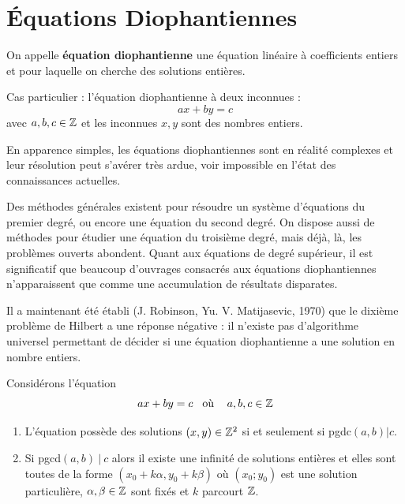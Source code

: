 \section{Équations Diophantiennes}

\begin{definition}
On appelle \textbf{équation diophantienne} une équation linéaire à coefficients entiers et pour laquelle on cherche des solutions entières.

\medskip
Cas particulier : l'équation diophantienne à deux inconnues : 
$$ax+by=c$$
avec $a,b,c\in\Z$ et les inconnues $x,y$ sont des nombres entiers.

\end{definition}

En apparence simples, les équations diophantiennes sont en réalité complexes et leur résolution peut s'avérer très ardue, voir impossible en l'état des connaissances actuelles.

\smallskip
Des méthodes générales existent pour résoudre un système d'équations du premier degré, ou encore une équation du second degré. On dispose aussi de méthodes pour étudier une équation du troisième degré, mais déjà, là, les problèmes ouverts abondent. Quant aux équations de degré supérieur, il est significatif que beaucoup d'ouvrages consacrés aux équations diophantiennes n'apparaissent que comme une accumulation de résultats disparates.


\smallskip
Il a maintenant été établi (J. Robinson, Yu. V. Matijasevic, 1970) que le dixième problème de Hilbert a une réponse négative : il n'existe pas d'algorithme universel permettant de décider si une équation diophantienne a une solution en nombre entiers.

\smallskip



\label{ssec:dioph}

\begin{proposition}
\label{prop:equations_diophantiennes}
Considérons l'équation
$$
ax+by=c \textrm{\eh{3}où\eh{3} } a,b,c \in \Z$$
\begin{enumerate}[label=\arabic*),left=0mm]
  \item L'équation possède des solutions $(x,y)\in \Z^2$ si et seulement si
pgdc$(a,b) | c$.
  \item Si pgcd$(a,b)\ |\ c$ alors il existe une infinité de solutions entières et elles sont toutes de la forme $(x_0+ k\alpha, y_0 + k\beta)$ où $(x_0;y_0)$ est une solution particulière, $\alpha,\beta \in \Z$ sont fixés et $k$ {parcourt $\Z$}.
\end{enumerate}
\end{proposition}

